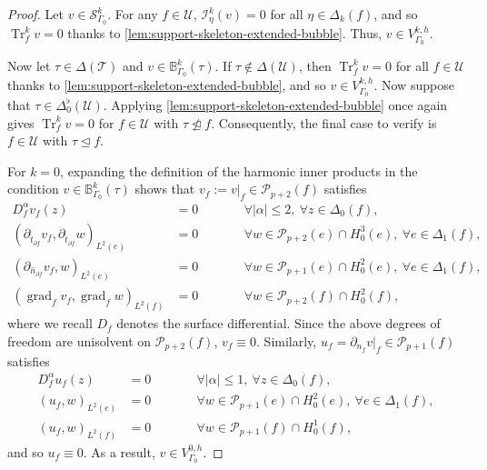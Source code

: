 \documentclass{mcom-l}
\theoremstyle{definition}
\theoremstyle{remark}
\numberwithin{equation}{section}
\newcommand{\unitvec}[1]{\hat{#1}}
\DeclareMathOperator{\Tr}{Tr}
\DeclareMathOperator{\subsimplex}{\unlhd}
\DeclareMathOperator{\notsubsimplex}{\ntrianglelefteq}
\newcommand{\mesh}[0]{\mathcal{T}}
\newcommand{\boundarymesh}[0]{\mathcal{U}}
\begin{document}
\begin{proof}
	Let $v \in \mathcal{S}^k_{\Gamma_0}$. For any $f \in \boundarymesh$,
	$\mathcal{I}^k_{\eta}(v) = 0$ for all $\eta \in \Delta_k(f)$, and so 
	$\Tr^k_{f} v = 0$ thanks to 
	\cref{lem:support-skeleton-extended-bubble}. 
	Thus, $v \in V_{\Gamma_0}^{k, h}$.
	
	Now let $\tau \in \Delta(\mesh)$ and 
	$v \in \mathbb{B}_{\Gamma_0}^k(\tau)$. 
	If $\tau \notin \Delta(\boundarymesh)$,
	then $\Tr^k_{f} v = 0$ for all $f \in \boundarymesh$
	thanks to \cref{lem:support-skeleton-extended-bubble},
	and so $v \in V_{\Gamma_0}^{k, h}$. Now suppose that 
	$\tau \in \Delta_0^{\flat}(\boundarymesh)$. Applying 
	\cref{lem:support-skeleton-extended-bubble} once again gives 
	$\Tr_{f}^k v = 0$ for $f \in \boundarymesh$
	with $\tau \notsubsimplex f$. Consequently, the final case to verify 
	is $f \in \boundarymesh$ with $\tau \subsimplex f$.
	
	For $k = 0$, expanding the definition of the harmonic inner products
	in the condition $v \in \mathbb{B}_{\Gamma_0}^k(\tau)$ shows that	
	$v_f := v|_{f} \in \mathcal{P}_{p+2}(f)$ satisfies 
	\begin{subequations}
		\label{eq:proof:Pp2-face-dofs}
		\begin{alignat}{2}
			D_f^{\alpha} v_f (z) &= 0 \qquad & &\forall |\alpha| \leq 2, 
			\ \forall z \in \Delta_0(f), \\
			(\partial_{\unitvec{t}_{\partial f}}v_f, \partial_{\unitvec{t}_{\partial f}}w)_{L^2(e)} &= 0 
			\qquad & &\forall w \in \mathcal{P}_{p+2}(e) \cap H^3_0(e), \ 
			\forall e \in \Delta_1(f), \\
			(\partial_{\unitvec{n}_{\partial f}} v_{f}, w )_{L^2(e)} &= 0 
			\qquad & &\forall w \in \mathcal{P}_{p+1}(e) \cap H^2_0(e), \ 
			\forall e \in \Delta_1(f), \\ 
			(\operatorname{grad}_fv_f, \operatorname{grad}_fw)_{L^2(f)} &=0 
			\qquad & &\forall w \in \mathcal{P}_{p+2}(f) \cap H^2_0(f),
		\end{alignat}	
	\end{subequations}
	where we recall $D_f$ denotes the surface differential.
	Since the above degrees of freedom are unisolvent on $\mathcal{P}_{p+2}(f)$,
	$v_{f} \equiv 0$. Similarly, 
	$u_f = \partial_{n_f} v|_f \in \mathcal{P}_{p+1}(f)$ satisfies
	\begin{subequations}
		\label{eq:proof:Pp1-face-dofs}
		\begin{alignat}{2}
			D_f^{\alpha} u_f (z) &= 0 \qquad & &\forall |\alpha| \leq 1, 
			\ \forall z \in \Delta_0(f), \\
			(u_f, w)_{L^2(e)} &= 0 
			\qquad & &\forall w \in \mathcal{P}_{p+1}(e) \cap H^2_0(e), \ 
			\forall e \in \Delta_1(f),  \\
			\label{eq:proof:Pp1-face-dofs-interior-face}
			(u_f, w)_{L^2(f)} &=0 
			\qquad & &\forall w \in \mathcal{P}_{p+1}(f) \cap H^1_0(f),
		\end{alignat}	
	\end{subequations}	
	and so $u_f \equiv 0$. As a result, $v \in V_{\Gamma_0}^{0, h}$.
	

\end{proof}
\end{document}
